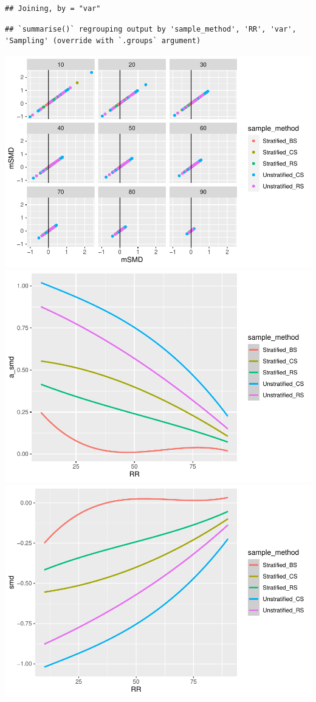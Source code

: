 \documentclass[
  english,
  man,floatsintext]{apa6}
\begin{document}
\begin{verbatim}
## Joining, by = "var"
\end{verbatim}

\begin{verbatim}
## `summarise()` regrouping output by 'sample_method', 'RR', 'var', 'Sampling' (override with `.groups` argument)
\end{verbatim}

\includegraphics{5---Analysis_files/figure-latex/unnamed-chunk-24-1.pdf} \includegraphics{5---Analysis_files/figure-latex/unnamed-chunk-24-2.pdf} \includegraphics{5---Analysis_files/figure-latex/unnamed-chunk-24-3.pdf}
\end{document}
